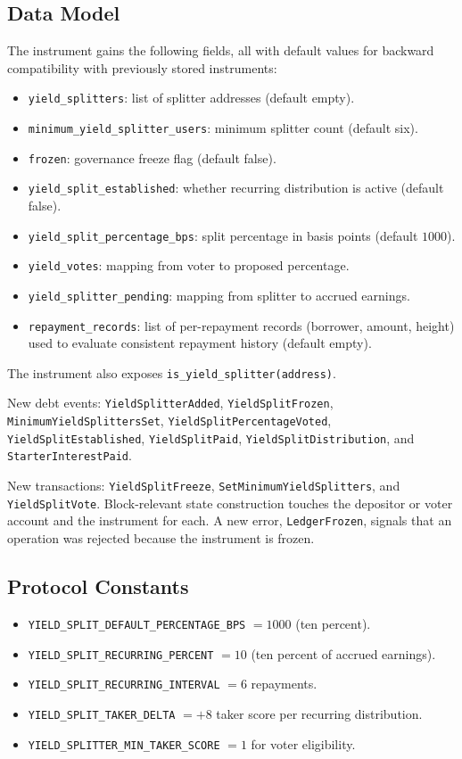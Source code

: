 \documentclass[11pt,a4paper]{article}
\begin{document}
\subsection{Data Model}
The instrument gains the following fields, all with default values for backward compatibility with previously stored instruments:
\begin{itemize}
\item \texttt{yield\_splitters}: list of splitter addresses (default empty).
\item \texttt{minimum\_yield\_splitter\_users}: minimum splitter count (default six).
\item \texttt{frozen}: governance freeze flag (default false).
\item \texttt{yield\_split\_established}: whether recurring distribution is active (default false).
\item \texttt{yield\_split\_percentage\_bps}: split percentage in basis points (default $1000$).
\item \texttt{yield\_votes}: mapping from voter to proposed percentage.
\item \texttt{yield\_splitter\_pending}: mapping from splitter to accrued earnings.
\item \texttt{repayment\_records}: list of per-repayment records (borrower, amount, height) used to evaluate consistent repayment history (default empty).
\end{itemize}
The instrument also exposes \texttt{is\_yield\_splitter(address)}.

New debt events: \texttt{YieldSplitterAdded}, \texttt{YieldSplitFrozen}, \texttt{MinimumYieldSplittersSet}, \texttt{YieldSplitPercentageVoted}, \texttt{YieldSplitEstablished}, \texttt{YieldSplitPaid}, \texttt{YieldSplitDistribution}, and \texttt{StarterInterestPaid}.

New transactions: \texttt{YieldSplitFreeze}, \texttt{SetMinimumYieldSplitters}, and \texttt{YieldSplitVote}. Block-relevant state construction touches the depositor or voter account and the instrument for each. A new error, \texttt{LedgerFrozen}, signals that an operation was rejected because the instrument is frozen.

\subsection{Protocol Constants}
\begin{itemize}
\item \texttt{YIELD\_SPLIT\_DEFAULT\_PERCENTAGE\_BPS} $= 1000$ (ten percent).
\item \texttt{YIELD\_SPLIT\_RECURRING\_PERCENT} $= 10$ (ten percent of accrued earnings).
\item \texttt{YIELD\_SPLIT\_RECURRING\_INTERVAL} $= 6$ repayments.
\item \texttt{YIELD\_SPLIT\_TAKER\_DELTA} $= +8$ taker score per recurring distribution.
\item \texttt{YIELD\_SPLITTER\_MIN\_TAKER\_SCORE} $= 1$ for voter eligibility.
\end{itemize}
\end{document}
